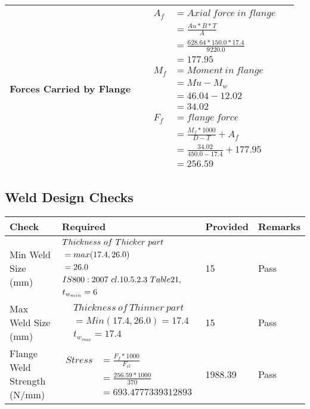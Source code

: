 \documentclass{article}%
\begin{document}
\begin{longtable}{|p{4cm}|p{5cm}|p{5.5cm}|p{1.5cm}|}
\hline%
Forces Carried by Flange&&$\begin{aligned} A_f&= Axial~force~ in ~flange  \\ &= \frac{Au * B *T}{A} \\ &= \frac{628.64 * 150.0*17.4}{9220.0} \\ &=177.95\\ M_f& =Moment~ in~ flange \\  & = Mu-M_w\\ &= 46.04-12.02\\ &=34.02\\  F_f& =flange~force  \\ & = \frac{M_f *1000}{D-T} + A_f \\ &= \frac{34.02}{450.0-17.4} +177.95 \\ &=256.59\end{aligned}$&\\%
\hline%
\end{longtable}

%
\newpage%
\subsection{Weld Design Checks}%
\label{subsec:WeldDesignChecks}%
\renewcommand{\arraystretch}{1.2}%
\begin{longtable}{|p{4cm}|p{5cm}|p{5.5cm}|p{1.5cm}|}%
\hline%
\rowcolor{OsdagGreen}%
Check&Required&Provided&Remarks\\%
\hline%
\endhead%
\hline%
Min Weld Size (mm)&$\begin{aligned} &Thickness~of~Thicker~part\\ \noindent &=max(17.4,26.0)\\ &=26.0\\ &IS800:2007~cl.10.5.2.3~Table 21,\\  &t_{w_{min}}=6\end{aligned}$&15&Pass\\%
\hline%
Max Weld Size (mm)&$\begin{aligned} & Thickness~of~Thinner~part\\ &=Min(17.4,26.0)=17.4\\ &t_{w_{max}} =17.4\end{aligned}$&15&Pass\\%
\hline%
Flange Weld Strength (N/mm)&$\begin{aligned} Stress &= \frac{F_f*1000}{F_{rl}}\\  &= \frac{256.59*1000}{370}\\ &= 693.4777339312893\end{aligned}$&1988.39&Pass\\%
\hline%
\end{longtable}
\end{document}
